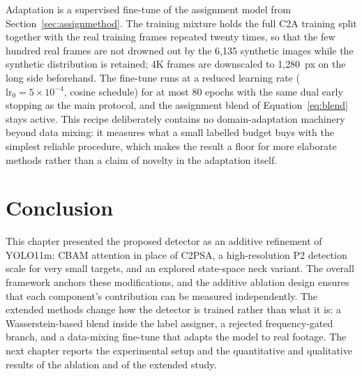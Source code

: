 Adaptation is a supervised fine-tune of the assignment model from
Section~\ref{sec:assignmethod}. The training mixture holds the full C2A training
split together with the real training frames repeated twenty times, so that the
few hundred real frames are not drowned out by the 6{,}135 synthetic images while
the synthetic distribution is retained; 4K frames are downscaled to 1{,}280~px on
the long side beforehand. The fine-tune runs at a reduced learning rate
($\mathrm{lr}_0 = 5\times10^{-4}$, cosine schedule) for at most 80 epochs with
the same dual early stopping as the main protocol, and the assignment blend of
Equation~\eqref{eq:blend} stays active. This recipe deliberately contains no
domain-adaptation machinery beyond data mixing: it measures what a small
labelled budget buys with the simplest reliable procedure, which makes the
result a floor for more elaborate methods rather than a claim of novelty in the
adaptation itself.

\section{Conclusion}
This chapter presented the proposed detector as an additive refinement of YOLO11m:
CBAM attention in place of C2PSA, a high-resolution P2 detection scale for very
small targets, and an explored state-space neck variant. The overall framework
anchors these modifications, and the additive ablation
design ensures that each component's contribution can be measured independently.
The extended methods change how the detector is trained rather than what it is:
a Wasserstein-based blend inside the label assigner, a rejected frequency-gated
branch, and a data-mixing fine-tune that adapts the model to real footage. The
next chapter reports the experimental setup and the quantitative and
qualitative results of the ablation and of the extended study.
